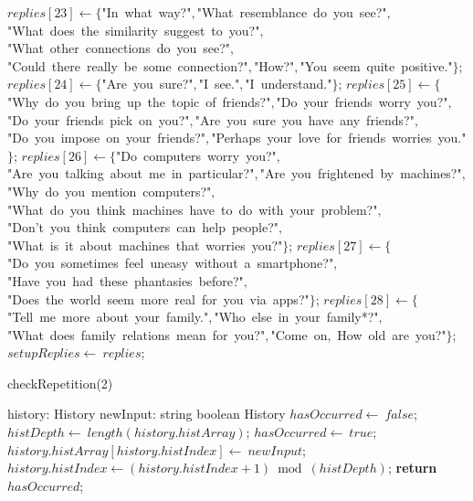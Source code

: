 \documentclass[a4paper,10pt]{article}
\begin{document}
\begin{algorithm}
\begin{algorithmic}[5]
  \State \(replies[23]\gets\{\)"{}In\ what\ way?"{}\(,\)"{}What\ resemblance\ do\ you\ see?"{}\(,\)"{}What\ does\ the\ similarity\ suggest\ to\ you?"{}\(,\)"{}What\ other\ connections\ do\ you\ see?"{}\(,\)"{}Could\ there\ really\ be\ some\ connection?"{}\(,\)"{}How?"{}\(,\)"{}You\ seem\ quite\ positive."{}\(\}\);
  \State \(replies[24]\gets\{\)"{}Are\ you\ sure?"{}\(,\)"{}I\ see."{}\(,\)"{}I\ understand."{}\(\}\);
  \State \(replies[25]\gets\{\)"{}Why\ do\ you\ bring\ up\ the\ topic\ of\ friends?"{}\(,\)"{}Do\ your\ friends\ worry\ you?"{}\(,\)"{}Do\ your\ friends\ pick\ on\ you?"{}\(,\)"{}Are\ you\ sure\ you\ have\ any\ friends?"{}\(,\)"{}Do\ you\ impose\ on\ your\ friends?"{}\(,\)"{}Perhaps\ your\ love\ for\ friends\ worries\ you."{}\(\}\);
  \State \(replies[26]\gets\{\)"{}Do\ computers\ worry\ you?"{}\(,\)"{}Are\ you\ talking\ about\ me\ in\ particular?"{}\(,\)"{}Are\ you\ frightened\ by\ machines?"{}\(,\)"{}Why\ do\ you\ mention\ computers?"{}\(,\)"{}What\ do\ you\ think\ machines\ have\ to\ do\ with\ your\ problem?"{}\(,\)"{}Don'{}t\ you\ think\ computers\ can\ help\ people?"{}\(,\)"{}What\ is\ it\ about\ machines\ that\ worries\ you?"{}\(\}\);
  \State \(replies[27]\gets\{\)"{}Do\ you\ sometimes\ feel\ uneasy\ without\ a\ smartphone?"{}\(,\)"{}Have\ you\ had\ these\ phantasies\ before?"{}\(,\)"{}Does\ the\ world\ seem\ more\ real\ for\ you\ via\ apps?"{}\(\}\);
  \State \(replies[28]\gets\{\)"{}Tell\ me\ more\ about\ your\ family."{}\(,\)"{}Who\ else\ in\ your\ family*?"{}\(,\)"{}What\ does\ family\ relations\ mean\ for\ you?"{}\(,\)"{}Come\ on,\ How\ old\ are\ you?"{}\(\}\);
  \State \(setupReplies\gets\ replies\);
\EndFunction
\end{algorithmic}
\end{algorithm}


\begin{algorithm}
\caption{checkRepetition(2)}
\begin{algorithmic}[5]
\State {}
\State {}
    \State history: History
    \State newInput: string
  \EndDecl
    \State boolean
  \EndDecl
    \State History
  \EndDecl
  \State \(hasOccurred\gets\ false\);
    \State \(histDepth\gets\ length(history.histArray)\);
        \State \(hasOccurred\gets\ true\);
      \EndIf
    \EndFor
    \State \(history.histArray[history.histIndex]\gets\ newInput\);
    \State \(history.histIndex\gets(history.histIndex+1)\bmod(histDepth)\);
  \EndIf
  \State \textbf{return} \(hasOccurred\);
\EndFunction
\end{algorithmic}
\end{algorithm}
\end{document}
